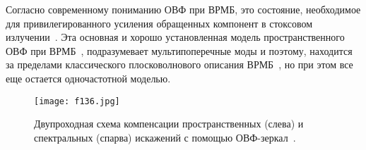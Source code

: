 Согласно современному пониманию ОВФ при ВРМБ, это состояние,
необходимое для привилегированного усиления обращенных компонент в
стоксовом излучении~\cite{1338}. Эта основная и хорошо установленная
модель пространственного ОВФ при ВРМБ~\cite{1338}, подразумевает
мультипоперечные моды и поэтому, находится за пределами
классического плосковолнового описания ВРМБ~\cite{1324}, но при этом
все еще остается одночастотной моделью.


\begin{figure}
\centering
\texttt{[image: f136.jpg]}\\
\caption{Двупроходная схема компенсации пространственных (слева)  и
спектральных (спарва) искажений с помощью ОВФ-зеркал~\cite{1300}.}
\label{f13.6}
\end{figure}

